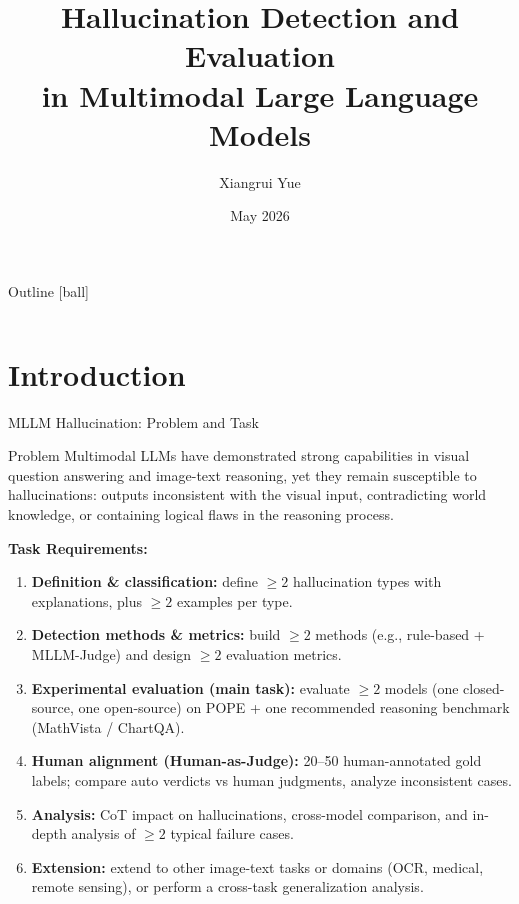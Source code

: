 \documentclass[9pt,aspectratio=169]{beamer}
\title[Hallucination Detection and Evaluation in Multimodal Large Language Models]{Hallucination Detection and Evaluation\\in Multimodal Large Language Models}
\date{May 2026}
\author{Xiangrui Yue}
\institute{}
\begin{document}

\begin{frame}{Outline}
  [ball]
  \vfill
  \begin{columns}[t,onlytextwidth]
      \large
      \tableofcontents[
        hideallsubsections,
        sectionstyle=show,
        sections={1-5}
      ]
      \large
      \tableofcontents[
        hideallsubsections,
        sectionstyle=show,
        sections={6-10}
      ]
  \end{columns}
  \vfill
\end{frame}

\section{Introduction}

\begin{frame}{MLLM Hallucination: Problem and Task}
  \begin{block}{Problem}
    Multimodal LLMs have demonstrated strong capabilities
    in visual question answering and image-text reasoning,
    yet they remain susceptible to \alert{hallucinations}:
    outputs inconsistent with the visual input,
    contradicting world knowledge,
    or containing logical flaws in the reasoning process.
  \end{block}

  \textbf{Task Requirements:}
  \begin{enumerate}\setlength{\itemsep}{0pt}\setlength{\parskip}{0pt}
    \item \textbf{Definition \& classification:}
          define $\geq 2$ hallucination types with explanations,
          plus $\geq 2$ examples per type.
    \item \textbf{Detection methods \& metrics:}
          build $\geq 2$ methods (e.g., rule-based + MLLM-Judge)
          and design $\geq 2$ evaluation metrics.
    \item \textbf{Experimental evaluation (main task):}
          evaluate $\geq 2$ models (one closed-source, one open-source)
          on POPE + one recommended reasoning benchmark
          (MathVista / ChartQA).
    \item \textbf{Human alignment (Human-as-Judge):}
          20--50 human-annotated gold labels;
          compare auto verdicts vs human judgments,
          analyze inconsistent cases.
    \item \textbf{Analysis:}
          CoT impact on hallucinations, cross-model comparison,
          and in-depth analysis of $\geq 2$ typical failure cases.
    \item \textbf{Extension:}
          extend to other image-text tasks or domains
          (OCR, medical, remote sensing),
          or perform a cross-task generalization analysis.
  \end{enumerate}
\end{frame}
\end{document}

